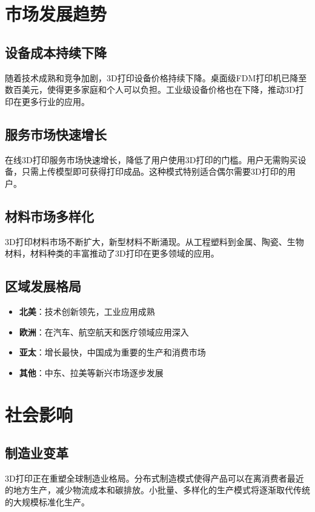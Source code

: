 \documentclass[12pt,UTF8]{ctexbook}
\begin{document}
\section{市场发展趋势}

\subsection{设备成本持续下降}
随着技术成熟和竞争加剧，3D打印设备价格持续下降。桌面级FDM打印机已降至数百美元，使得更多家庭和个人可以负担。工业级设备价格也在下降，推动3D打印在更多行业的应用。

\subsection{服务市场快速增长}
在线3D打印服务市场快速增长，降低了用户使用3D打印的门槛。用户无需购买设备，只需上传模型即可获得打印成品。这种模式特别适合偶尔需要3D打印的用户。

\subsection{材料市场多样化}
3D打印材料市场不断扩大，新型材料不断涌现。从工程塑料到金属、陶瓷、生物材料，材料种类的丰富推动了3D打印在更多领域的应用。

\subsection{区域发展格局}
\begin{itemize}
\item \textbf{北美}：技术创新领先，工业应用成熟
\item \textbf{欧洲}：在汽车、航空航天和医疗领域应用深入
\item \textbf{亚太}：增长最快，中国成为重要的生产和消费市场
\item \textbf{其他}：中东、拉美等新兴市场逐步发展
\end{itemize}

\section{社会影响}

\subsection{制造业变革}
3D打印正在重塑全球制造业格局。分布式制造模式使得产品可以在离消费者最近的地方生产，减少物流成本和碳排放。小批量、多样化的生产模式将逐渐取代传统的大规模标准化生产。
\end{document}
